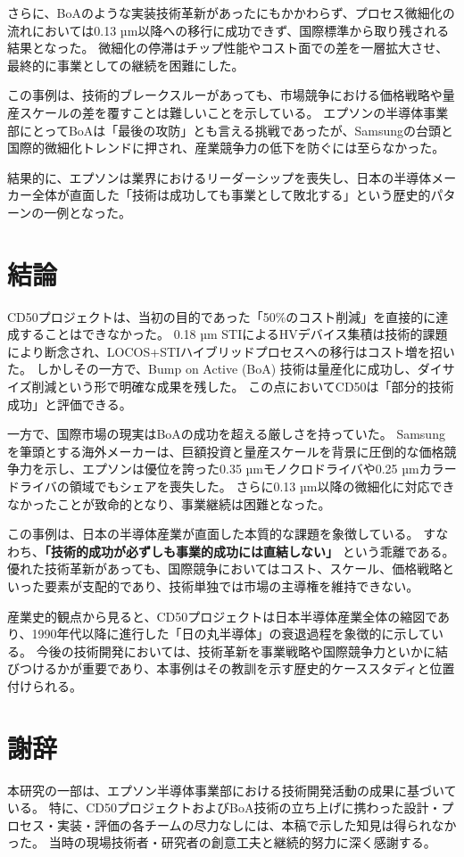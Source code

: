 \documentclass[conference]{IEEEtran}
\begin{document}
さらに、BoAのような実装技術革新があったにもかかわらず、プロセス微細化の流れにおいては0.13 µm以降への移行に成功できず、国際標準から取り残される結果となった。  
微細化の停滞はチップ性能やコスト面での差を一層拡大させ、最終的に事業としての継続を困難にした。

この事例は、技術的ブレークスルーがあっても、市場競争における価格戦略や量産スケールの差を覆すことは難しいことを示している。  
エプソンの半導体事業部にとってBoAは「最後の攻防」とも言える挑戦であったが、Samsungの台頭と国際的微細化トレンドに押され、産業競争力の低下を防ぐには至らなかった。

結果的に、エプソンは業界におけるリーダーシップを喪失し、日本の半導体メーカー全体が直面した「技術は成功しても事業として敗北する」という歴史的パターンの一例となった。

\section{結論}
CD50プロジェクトは、当初の目的であった「50\%のコスト削減」を直接的に達成することはできなかった。  
0.18 µm STIによるHVデバイス集積は技術的課題により断念され、LOCOS+STIハイブリッドプロセスへの移行はコスト増を招いた。  
しかしその一方で、Bump on Active (BoA) 技術は量産化に成功し、ダイサイズ削減という形で明確な成果を残した。  
この点においてCD50は「部分的技術成功」と評価できる。

一方で、国際市場の現実はBoAの成功を超える厳しさを持っていた。  
Samsungを筆頭とする海外メーカーは、巨額投資と量産スケールを背景に圧倒的な価格競争力を示し、エプソンは優位を誇った0.35 µmモノクロドライバや0.25 µmカラードライバの領域でもシェアを喪失した。  
さらに0.13 µm以降の微細化に対応できなかったことが致命的となり、事業継続は困難となった。

この事例は、日本の半導体産業が直面した本質的な課題を象徴している。  
すなわち、\textbf{「技術的成功が必ずしも事業的成功には直結しない」} という乖離である。  
優れた技術革新があっても、国際競争においてはコスト、スケール、価格戦略といった要素が支配的であり、技術単独では市場の主導権を維持できない。  

産業史的観点から見ると、CD50プロジェクトは日本半導体産業全体の縮図であり、1990年代以降に進行した「日の丸半導体」の衰退過程を象徴的に示している。  
今後の技術開発においては、技術革新を事業戦略や国際競争力といかに結びつけるかが重要であり、本事例はその教訓を示す歴史的ケーススタディと位置付けられる。

\section*{謝辞}
本研究の一部は、エプソン半導体事業部における技術開発活動の成果に基づいている。  
特に、CD50プロジェクトおよびBoA技術の立ち上げに携わった設計・プロセス・実装・評価の各チームの尽力なしには、本稿で示した知見は得られなかった。  
当時の現場技術者・研究者の創意工夫と継続的努力に深く感謝する。  
\end{document}
